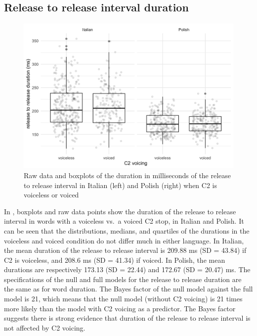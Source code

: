 \documentclass[charis]{glossa}
\begin{document}
\hypertarget{release-to-release-interval-duration}{%
\subsection{Release to release interval
duration}\label{release-to-release-interval-duration}}

\begin{figure}
\includegraphics[width=\linewidth]{./Figure5-1} \caption{Raw data and boxplots of the duration in milliseconds of the release to release interval in Italian (left) and Polish (right) when C2 is voiceless or voiced}\label{f:Figure5}
\end{figure}

In , boxplots and raw data points show the duration of
the release to release interval in words with a voiceless vs.~a voiced
C2 stop, in Italian and Polish. It can be seen that the distributions,
medians, and quartiles of the durations in the voiceless and voiced
condition do not differ much in either language. In Italian, the mean
duration of the release to release interval is 209.88 ms (SD = 43.84) if
C2 is voiceless, and 208.6 ms (SD = 41.34) if voiced. In Polish, the
mean durations are respectively 173.13 (SD = 22.44) and 172.67 (SD =
20.47) ms. The specifications of the null and full models for the
release to release duration are the same as for word duration. The Bayes
factor of the null model against the full model is 21, which means that
the null model (without C2 voicing) is 21 times more likely than the
model with C2 voicing as a predictor. The Bayes factor suggests there is
strong evidence that duration of the release to release interval is not
affected by C2 voicing.
\end{document}
